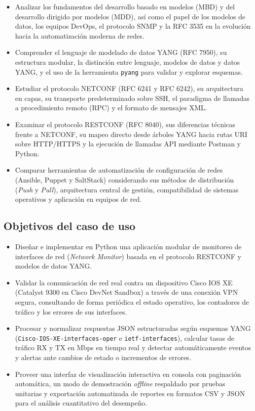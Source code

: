 \documentclass[12pt,a4paper]{article}
\begin{document}
\begin{itemize}
    \item Analizar los fundamentos del desarrollo basado en modelos (MBD) y del desarrollo dirigido por modelos (MDD), así como el papel de los modelos de datos, los equipos DevOps, el protocolo SNMP y la RFC 3535 en la evolución hacia la automatización moderna de redes.
    \item Comprender el lenguaje de modelado de datos YANG (RFC 7950), su estructura modular, la distinción entre lenguaje, modelos de datos y datos YANG, y el uso de la herramienta \texttt{pyang} para validar y explorar esquemas.
    \item Estudiar el protocolo NETCONF (RFC 6241 y RFC 6242), su arquitectura en capas, su transporte predeterminado sobre SSH, el paradigma de llamadas a procedimiento remoto (RPC) y el formato de mensajes XML.
    \item Examinar el protocolo RESTCONF (RFC 8040), sus diferencias técnicas frente a NETCONF, su mapeo directo desde árboles YANG hacia rutas URI sobre HTTP/HTTPS y la ejecución de llamadas API mediante Postman y Python.
    \item Comparar herramientas de automatización de configuración de redes (Ansible, Puppet y SaltStack) considerando sus métodos de distribución (\textit{Push} y \textit{Pull}), arquitectura central de gestión, compatibilidad de sistemas operativos y aplicación en equipos de red.
\end{itemize}

\subsection{Objetivos del caso de uso}

\begin{itemize}
    \item Diseñar e implementar en Python una aplicación modular de monitoreo de interfaces de red (\textit{Network Monitor}) basada en el protocolo RESTCONF y modelos de datos YANG.
    \item Validar la comunicación de red real contra un dispositivo Cisco IOS XE (Catalyst 9300 en Cisco DevNet Sandbox) a través de una conexión VPN segura, consultando de forma periódica el estado operativo, los contadores de tráfico y los errores de sus interfaces.
    \item Procesar y normalizar respuestas JSON estructuradas según esquemas YANG (\texttt{Cisco-IOS-XE-interfaces-oper} e \texttt{ietf-interfaces}), calcular tasas de tráfico RX y TX en Mbps en tiempo real y detectar automáticamente eventos y alertas ante cambios de estado o incrementos de errores.
    \item Proveer una interfaz de visualización interactiva en consola con paginación automática, un modo de demostración \textit{offline} respaldado por pruebas unitarias y exportación automatizada de reportes en formatos CSV y JSON para el análisis cuantitativo del desempeño.
\end{itemize}
\end{document}
